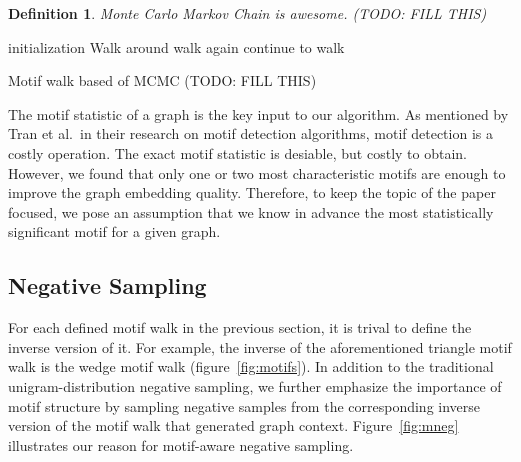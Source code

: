 \documentclass[letterpaper]{article}
\newtheorem{ntdef}{Definition}
\begin{document}
            \begin{ntdef}
                Monte Carlo Markov Chain is awesome. (TODO: FILL THIS)
            \end{ntdef}


            \begin{algorithm}
                \DontPrintSemicolon
                initialization\;
                 {
                    Walk around\;
                     {
                        walk again\;
                    } {
                        continue to walk\;
                    }
                }
                \caption{Motif walk based of MCMC (TODO: FILL THIS)}
                \label{al:amotif}
            \end{algorithm}

            The motif statistic of a graph is the key input to our algorithm. As mentioned by Tran et al.\ in
            their research on motif detection algorithms, motif detection is a costly operation. The
            exact motif statistic is desiable, but costly to obtain. However, we found that only one or 
            two most characteristic motifs are enough to improve the graph embedding quality. Therefore, 
            to keep the topic of the paper focused, we pose an assumption that we know in advance the most
            statistically significant motif for a given graph. 

        \subsection{Negative Sampling}

            For each defined motif walk in the previous section, it is trival to define the inverse version
            of it. For example, the inverse of the aforementioned triangle motif walk is the wedge motif
            walk (figure~\ref{fig:motifs}). In addition to the traditional unigram-distribution negative
            sampling, we further emphasize the importance of motif structure by sampling negative samples
            from the corresponding inverse version of the motif walk that generated graph context. 
            Figure~\ref{fig:mneg} illustrates our reason for motif-aware negative sampling.
\end{document}
